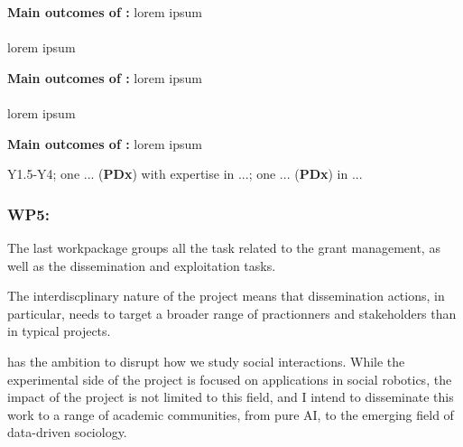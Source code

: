 \begin{framed}
    {\noindent\bf Main outcomes of \tDB:} lorem ipsum 
\end{framed}

\paragraph{\TDD}

lorem ipsum

\begin{framed}
    {\noindent\bf Main outcomes of \tDD:} lorem ipsum 
\end{framed}


\paragraph{\TDC}

lorem ipsum

\begin{framed}
    {\noindent\bf Main outcomes of \tDC:} lorem ipsum 
\end{framed}


\begin{framed}
     Y1.5-Y4; one ... ({\bf PDx}) with expertise in
    ...; one ... ({\bf PDx}) in ...
\end{framed}


\subsubsection{WP5: \textbf{\WPZ}}

The last workpackage groups all the task related to the grant management, as
well as the dissemination and exploitation tasks.

The interdiscplinary nature of the project means that dissemination actions, in
particular, needs to target a broader range of practionners and stakeholders
than in typical projects.

\project has the ambition to disrupt how we study social interactions. While the
experimental side of the project is focused on applications in social robotics,
the impact of the project is not limited to this field, and I intend to
disseminate this work to a range of academic communities, from pure AI, to the
emerging field of data-driven sociology.


\paragraph{\TZA}

